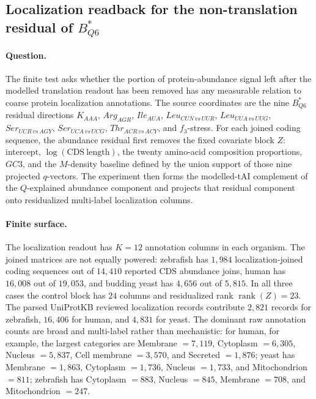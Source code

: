 \subsection{Localization readback for the non-translation residual of $B^*_{Q6}$}\label{sec:bioreality-q6-h-candidate-localization-nontranslation-residual}

\paragraph{Question.}
The finite test asks whether the portion of protein-abundance signal left after the modelled translation readout has been removed has any measurable relation to coarse protein localization annotations.  The source coordinates are the nine $B^*_{Q6}$ residual directions
$K_{AAA}$, $Arg_{AGR}$, $Ile_{AUA}$, $Leu_{CUN\,vs\,UUR}$, $Leu_{UUA\,vs\,UUG}$, $Ser_{UCR\,vs\,AGY}$, $Ser_{UCA\,vs\,UCG}$, $Thr_{ACR\,vs\,ACY}$, and $f_3$-stress.  For each joined coding sequence, the abundance residual first removes the fixed covariate block $Z$: intercept, $\log(\mathrm{CDS\ length})$, the twenty amino-acid composition proportions, $GC3$, and the $M$-density baseline defined by the union support of those nine projected $q$-vectors.  The experiment then forms the modelled-tAI complement of the $Q$-explained abundance component and projects that residual component onto residualized multi-label localization columns.

\paragraph{Finite surface.}
The localization readout has $K=12$ annotation columns in each organism.  The joined matrices are not equally powered: zebrafish has $1{,}984$ localization-joined coding sequences out of $14{,}410$ reported CDS abundance joins, human has $16{,}008$ out of $19{,}053$, and budding yeast has $4{,}656$ out of $5{,}815$.  In all three cases the control block has $24$ columns and residualized rank $\operatorname{rank}(Z)=23$.  The parsed UniProtKB reviewed localization records contribute $2{,}821$ records for zebrafish, $16{,}406$ for human, and $4{,}831$ for yeast.  The dominant raw annotation counts are broad and multi-label rather than mechanistic: for human, for example, the largest categories are Membrane $=7{,}119$, Cytoplasm $=6{,}305$, Nucleus $=5{,}837$, Cell membrane $=3{,}570$, and Secreted $=1{,}876$; yeast has Membrane $=1{,}863$, Cytoplasm $=1{,}736$, Nucleus $=1{,}733$, and Mitochondrion $=811$; zebrafish has Cytoplasm $=883$, Nucleus $=845$, Membrane $=708$, and Mitochondrion $=247$.

